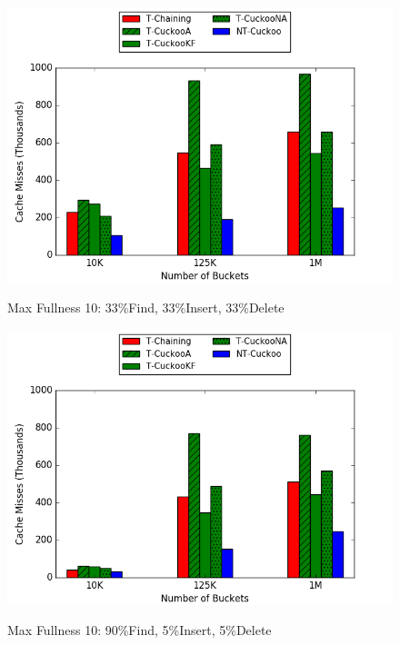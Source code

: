    \begin{figure}[H]
    \centering
        \begin{minipage}{0.75\textwidth}
        \centering
            {\includegraphics[width=\textwidth]{maps/3310cm.png}}
            \caption*{Max Fullness 10: 33\%Find, 33\%Insert, 33\%Delete}
            \vspace{20pt}
        \end{minipage}
        \begin{minipage}{0.75\textwidth}
            \centering
            {\includegraphics[width=\textwidth]{maps/9010cm.png}}
            \caption*{Max Fullness 10: 90\%Find, 5\%Insert, 5\%Delete}
        \end{minipage}
    \end{figure}


